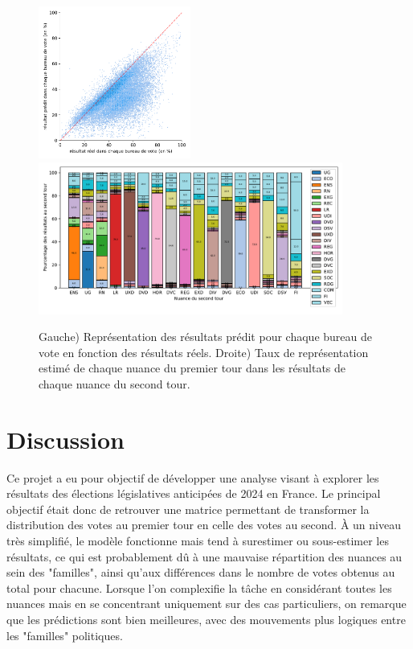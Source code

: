 \documentclass[11pt]{article}
\begin{document}
            \begin{figure}[h]
                \begin{center}
                    \includegraphics[height=5cm]{Total_True_Pred_Hist.pdf}
                    \includegraphics[height=5cm]{Total-Matrice-Participation.pdf}
                    \caption{Gauche) Représentation des résultats prédit pour chaque bureau de vote en fonction des résultats réels. Droite) Taux de représentation estimé de chaque nuance du premier tour dans les résultats de chaque nuance du second tour.}
                    \label{fig:True-Pred-Total}
                \end{center}
            \end{figure}
        
    \newpage
    \section{Discussion}
        Ce projet a eu pour objectif de développer une analyse visant à explorer les résultats des élections législatives anticipées de 2024 en France. Le principal objectif était donc de retrouver une matrice permettant de transformer la distribution des votes au premier tour en celle des votes au second.
        À un niveau très simplifié, le modèle fonctionne mais tend à surestimer ou sous-estimer les résultats, ce qui est probablement dû à une mauvaise répartition des nuances au sein des "familles", ainsi qu'aux différences dans le nombre de votes obtenus au total pour chacune.
        Lorsque l'on complexifie la tâche en considérant toutes les nuances mais en se concentrant uniquement sur des cas particuliers, on remarque que les prédictions sont bien meilleures, avec des mouvements plus logiques entre les "familles" politiques.
    
\end{document}
